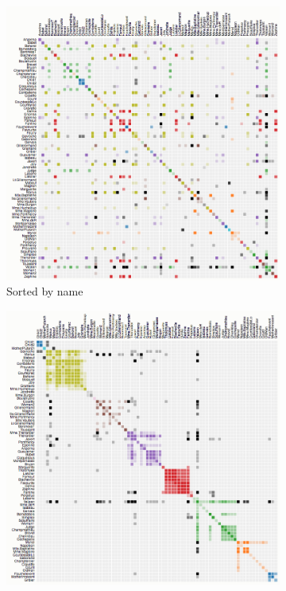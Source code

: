 \begin{figure}[H]
     \centering
      \begin{subfigure}[b]{.49\textwidth}
         \centering
         \includegraphics[width=\textwidth]{figures_c1/adja.png}
         \caption{Sorted by name}
         \label{fig:adja}
     \end{subfigure}
            \begin{subfigure}[b]{.49\textwidth}
         \centering
         \includegraphics[width=\textwidth]{figures_c1/adjc.png}

\end{subfigure}
\end{figure}
